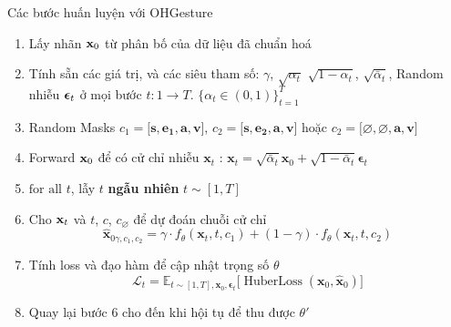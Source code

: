 \begin{frame}{Các bước huấn luyện với OHGesture}
	\begin{enumerate}
		\item<1-2>  Lấy nhãn $\mathbf{x}_0$ từ phân bố của dữ liệu đã chuẩn hoá
		\item<2-3> Tính sẵn các giá trị, và các siêu tham số: $\gamma$, $\sqrt{\alpha_t}$ $\sqrt{1 - \alpha_t}$, $\sqrt{\bar{\alpha}_t}$, Random nhiễu ${\boldsymbol{\epsilon}}_t$ ở mọi bước $t: 1 \rightarrow T$.
		$\{\alpha_t \in (0, 1)\}_{t=1}^T$
		\item<2> Random Masks  $c_{1} = \big[ \mathbf{s} , \mathbf{e_1}, \mathbf{a}, \mathbf{v} \big]$, $c_{2} = \big[ \mathbf{s} , \mathbf{e_2}, \mathbf{a}, \mathbf{v}\big]$ hoặc $c_{2} = \big[ \varnothing , \varnothing, \mathbf{a},  \mathbf{v} \big]$
		\item<3> Forward $\mathbf{x}_0$ để có cử chỉ nhiễu $\mathbf{x}_t$ :  $\mathbf{x}_t = \sqrt{\bar{\alpha}_t}\mathbf{x}_0 + \sqrt{1 - \bar{\alpha}_t}\boldsymbol{\epsilon}_t$
		\item<4> $\text{for all}$ $t$, lẫy $t$ \textbf{ngẫu nhiên} $t \sim [1, T]$
		\item<5> Cho $\mathbf{x}_t$ và $t$, $c$, $c_{\varnothing}$ để dự đoán chuỗi cử chỉ
		\begin{equation}
			\hat{\mathbf{x}}_{0 \gamma, c_{1}, c_{2}}=\gamma \cdot f_{\theta}  \left(\mathbf{x}_{t}, t, c_{1}\right)+(1-\gamma) \cdot f_{\theta} \left(\mathbf{x}_{t}, t, c_{2}\right)
		\end{equation}

		\item<6-> Tính loss và đạo hàm để cập nhật trọng số $\theta$
		\begin{equation}
			\mathcal{L}_t = \mathbb{E}_{t \sim [1, T], \mathbf{x}_0, \boldsymbol{\epsilon}_t} \Big[ \operatorname{HuberLoss}(\mathbf{x}_0, \hat{\mathbf{x}}_0 ) \Big]
		\end{equation}
	
	
		\item<6-> Quay lại bước 6 cho đến khi hội tụ để thu được $\theta'$
	\end{enumerate}
\end{frame}


